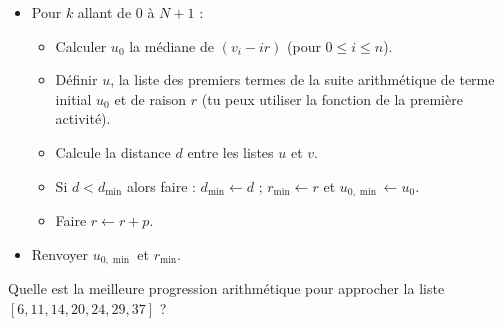 \documentclass[11pt,class=report,crop=false]{standalone}
\begin{document}
\begin{activite}
\begin{enumerate}
\begin{algorithme}
\begin{itemize}
  \item Pour $k$ allant de $0$ à $N+1$ :
  
   \begin{itemize}
     \item Calculer $u_0$ la médiane de $(v_i - ir)$ (pour $0 \le i \le n$).
     
     \item Définir $u$, la liste des premiers termes de la suite arithmétique de terme initial $u_0$ et de raison $r$ (tu peux utiliser la fonction  de la première activité).
     
     \item Calcule la distance $d$ entre les listes $u$ et $v$.
     
     \item Si $d < d_{\min}$ alors faire :
      $d_{\min} \leftarrow d$ ; $r_{\min} \leftarrow r$ et  $u_{0,\min} \leftarrow u_0$.
      
      \item Faire $r \leftarrow r + p$.
  \end{itemize}
   
   \item Renvoyer $u_{0,\min}$ et $r_{\min}$.   
 \end{itemize}  
 \end{algorithme}

 Quelle est la meilleure progression arithmétique pour approcher la liste 
 $[6,11,14,20,24,29,37]$ ?
 
 
\end{enumerate} 
\end{activite}


\end{document}
